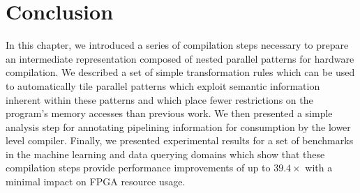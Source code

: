 \section{Conclusion}

In this chapter, we introduced a series of compilation steps necessary to prepare
an intermediate representation composed of nested parallel patterns
for hardware compilation. We described a set of simple transformation
rules which can be used to automatically tile parallel patterns which exploit semantic information inherent within
these patterns and which place fewer restrictions on the program’s memory accesses than previous work. We then presented a simple analysis step for annotating pipelining information for
consumption by the lower level compiler. Finally, we presented experimental results
for a set of benchmarks in the machine learning and data
querying domains which show that these compilation steps
provide performance improvements of up to $39.4\times$ with a
minimal impact on FPGA resource usage.
